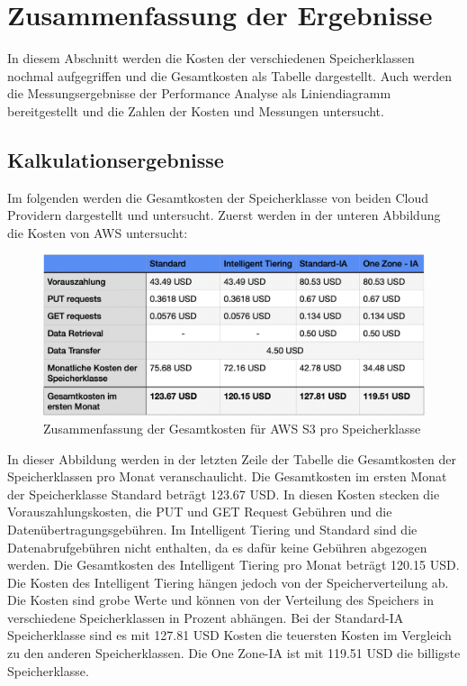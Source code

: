 \newpage

\section{Zusammenfassung der Ergebnisse}

In diesem Abschnitt werden die Kosten der verschiedenen Speicherklassen nochmal aufgegriffen und die Gesamtkosten als Tabelle dargestellt. Auch werden die Messungsergebnisse der Performance Analyse als Liniendiagramm bereitgestellt und die Zahlen der Kosten und Messungen untersucht.

\subsection{Kalkulationsergebnisse}

Im folgenden werden die Gesamtkosten der Speicherklasse von beiden Cloud Providern dargestellt und untersucht. Zuerst werden in der unteren Abbildung die Kosten von AWS untersucht:

\begin{figure}[h]
	\centering
	\includegraphics[width=13cm,keepaspectratio]{Pictures/AWSGesamtkosten.png}
	\caption{Zusammenfassung der Gesamtkosten für AWS S3 pro Speicherklasse}
\end{figure}

In dieser Abbildung werden in der letzten Zeile der Tabelle die Gesamtkosten der Speicherklassen pro Monat veranschaulicht. Die Gesamtkosten im ersten Monat der Speicherklasse Standard beträgt 123.67 USD. In diesen Kosten stecken die Vorauszahlungskosten, die PUT und GET Request Gebühren und die Datenübertragungsgebühren. Im Intelligent Tiering und Standard sind die Datenabrufgebühren nicht enthalten, da es dafür keine Gebühren abgezogen werden. Die Gesamtkosten des Intelligent Tiering pro Monat beträgt 120.15 USD. Die Kosten des Intelligent Tiering hängen jedoch von der Speicherverteilung ab. Die Kosten sind grobe Werte und können von der Verteilung des Speichers in verschiedene Speicherklassen in Prozent abhängen. Bei der Standard-IA Speicherklasse sind es mit 127.81 USD Kosten die teuersten Kosten im Vergleich zu den anderen Speicherklassen. Die One Zone-IA ist mit 119.51 USD die billigste Speicherklasse.

